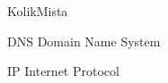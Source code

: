 \begin{seznamzkratek}{KolikMista}

		{DNS}
		{Domain Name System}
		
		{IP}
		{Internet Protocol}


\end{seznamzkratek}
